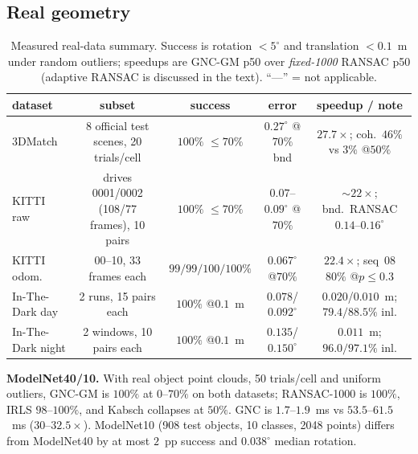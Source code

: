 \subsection{Real geometry}

\begin{table}[t]
\caption{Measured real-data summary. Success is rotation $<5^\circ$ and translation $<0.1$~m under
random outliers; speedups are GNC-GM p50 over \emph{fixed-1000} RANSAC p50 (adaptive RANSAC is
discussed in the text). ``---'' = not applicable.}
\label{tab:real}
\centering
\scriptsize
\setlength{\tabcolsep}{2.4pt}
\begin{tabular}{lcccc}
\toprule
dataset & subset & success & error & speedup / note \\
\midrule
3DMatch & 8 official test scenes, 20 trials/cell & $100\%$ $\le70\%$ & $0.27^\circ$ @$70\%$ bnd &
$27.7\times$; coh.\ $46\%$ vs $3\%$ @$50\%$ \\
KITTI raw & drives 0001/0002 (108/77 frames), 10 pairs & $100\%$ $\le70\%$ &
$0.07$--$0.09^\circ$ @$70\%$ & $\sim22\times$; bnd.\ RANSAC $0.14$--$0.16^\circ$ \\
KITTI odom. & 00--10, 33 frames each & $99/99/100/100\%$ & $0.067^\circ$ @$70\%$ &
$22.4\times$; seq~08 $80\%$ @$p\le0.3$ \\
In-The-Dark day & 2 runs, 15 pairs each & $100\%$ @$0.1$~m & $0.078$/$0.092^\circ$ &
$0.020$/$0.010$~m; $79.4/88.5\%$ inl. \\
In-The-Dark night & 2 windows, 10 pairs each & $100\%$ @$0.1$~m & $0.135$/$0.150^\circ$ &
$0.011$~m; $96.0/97.1\%$ inl. \\
\bottomrule
\end{tabular}
\end{table}

\noindent\textbf{ModelNet40/10.} With real object point clouds, 50 trials/cell and uniform outliers,
GNC-GM is $100\%$ at $0$--$70\%$ on both datasets; RANSAC-1000 is $100\%$, IRLS $98$--$100\%$, and
Kabsch collapses at $50\%$. GNC is $1.7$--$1.9$~ms vs $53.5$--$61.5$~ms ($30$--$32.5\times$).
ModelNet10 (908 test objects, 10 classes, 2048 points) differs from ModelNet40 by at most $2$~pp
success and $0.038^\circ$ median rotation.

